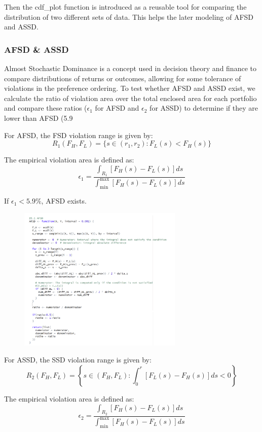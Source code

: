 \documentclass{article}
\begin{document}
Then the cdf\_plot function is introduced as a reusable tool for comparing the distribution of two different sets of data. This helps the later modeling of AFSD and ASSD. 

\hypertarget{AFSD \& ASSD}{%
\subsubsection{AFSD \& ASSD}\label{AFSD ASSD}}
Almost Stochastic Dominance is a concept used in decision theory and finance to compare distributions of returns or outcomes, allowing for some tolerance of violations in the preference ordering. To test whether AFSD and ASSD exist, we calculate the ratio of violation area over the total enclosed area for each portfolio and compare these ratios ($\epsilon_1$ for AFSD and $\epsilon_2$ for ASSD) to determine if they are lower than AFSD (5.9%

For AFSD, the FSD violation range is given by:
\[
R_1(F_H, F_L) = \{s \in (r_1, r_2): F_L(s) < F_H(s)\}
\]

The empirical violation area is defined as:
\[
\epsilon_1 = \frac{\int_{R_1} \left[F_H(s) - F_L(s)\right] ds}{\int_{\text{min}}^{\text{max}} \left[F_H(s) - F_L(s)\right] ds}
\]

If $\epsilon_1 < 5.9\%$, AFSD exists.
\begin{figure}[H]
    \centering
    \includegraphics[width=0.7\textwidth]{11.png}
    \label{fig:example}
\end{figure}
For ASSD, the SSD violation range is given by:
\[
R_2(F_H, F_L) = \left\{ s \in (F_H, F_L) : \int_0^r \left[ F_L(s) - F_H(s) \right] ds < 0 \right\}
\]

The empirical violation area is defined as:
\[
\epsilon_2 = \frac{\int_{R_2} \left[ F_H(s) - F_L(s) \right] ds}{\int_{\text{min}}^{\text{max}} \left[ F_H(s) - F_L(s) \right] ds}
\]
\end{document}
